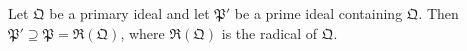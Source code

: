 Let $\mathfrak{Q}$ be a primary ideal and let $\mathfrak{P}'$ be a prime ideal containing $\mathfrak{Q}$. Then $\mathfrak{P}' \supseteq \mathfrak{P} = \mathfrak{R}(\mathfrak{Q})$, where $\mathfrak{R}(\mathfrak{Q})$ is the radical of $\mathfrak{Q}$.
